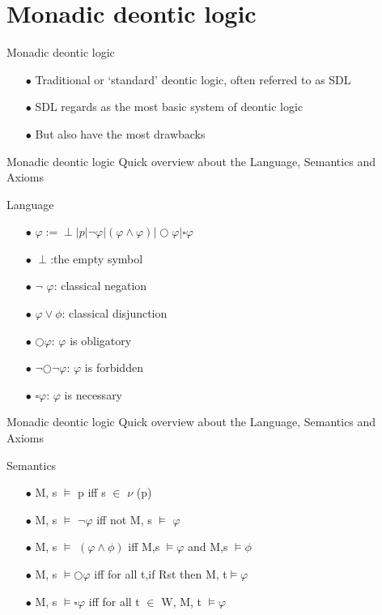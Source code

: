 \documentclass{beamer}
\begin{document}
\section{Monadic deontic logic}
\begin{frame}{Monadic deontic logic}
\begin{enumerate}
\item[$\bullet$]Traditional or ‘standard’ deontic logic, often referred to as SDL
\item[$\bullet$]SDL regards as the most basic system of deontic logic
\item[$\bullet$]But also have the most drawbacks
\end{enumerate}
\end{frame}
\begin{frame}{Monadic deontic logic}
Quick overview about the Language, Semantics and Axioms
\begin{block}{Language}
\begin{enumerate}
\item[$\bullet$]$\varphi :=\perp | p |\neg \varphi |(\varphi \wedge \varphi)|\bigcirc\varphi|\square\varphi $\\
\item[$\bullet$]$\perp$:the empty symbol\\
\item[$\bullet$]$\neg$ $\varphi$: classical negation\\
\item[$\bullet$]$\varphi \vee  \phi $: classical disjunction\\
\item[$\bullet$]$\bigcirc \varphi $: $\varphi$ is obligatory\\
\item[$\bullet$]$ \neg \bigcirc\neg\varphi$: $ \varphi$ is forbidden\\
\item[$\bullet$]$ \square\varphi$: $\varphi$ is necessary
\end{enumerate}
\end{block}
\end{frame}
\begin{frame}{Monadic deontic logic}
Quick overview about the Language, Semantics and Axioms
\begin{block}{Semantics}
\begin{enumerate}
\item[$\bullet$ ]M, s $ \vDash $ p iff s $\in$ $\nu$  (p)
\item[$\bullet$ ]M, s $ \vDash $ $\neg \varphi$ iff not M, s $ \vDash $ $\varphi$
\item[$\bullet$ ]M, s $ \vDash $ $(\varphi\land\phi )$ iff M,s $ \vDash \varphi$ and  M,s $ \vDash \phi$
\item[$\bullet$ ]M, s $ \vDash  \bigcirc\varphi$ iff for all t,if Rst then M, t$\vDash \varphi$
\item[$\bullet$ ]M, s $ \vDash  \square\varphi$ iff for all t $\in$ W, M, t $\vDash \varphi$
\end{enumerate}
\end{block}
\end{frame}
\end{document}
